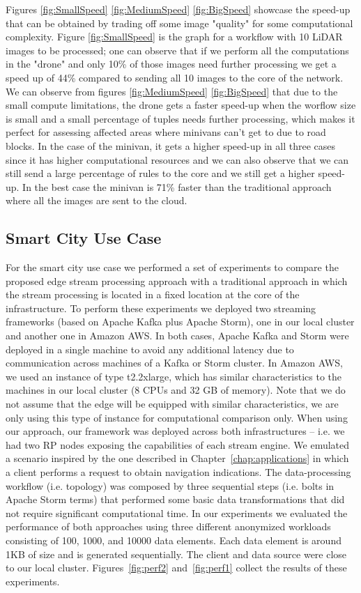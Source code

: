 Figures \ref{fig:SmallSpeed} \ref{fig:MediumSpeed} \ref{fig:BigSpeed} showcase the speed-up that can be obtained by trading off some image "quality" for some computational complexity. Figure \ref{fig:SmallSpeed} is the graph for a workflow with 10 LiDAR images to be processed; one can observe that if we perform all the computations in the "drone" and only 10\% of those images need further processing we get a speed up of 44\% compared to sending all 10 images to the core of the network. We can observe from figures \ref{fig:MediumSpeed} \ref{fig:BigSpeed} that due to the small compute limitations, the drone gets a faster speed-up when the worflow size is small and a small percentage of tuples needs further processing, which makes it perfect for assessing affected areas where minivans can't get to due to road blocks. In the case of the minivan, it gets a higher speed-up in all three cases since it has higher computational resources and we can also observe that we can still send a large percentage of rules to the core and we still get a higher speed-up. In the best case the minivan is 71\% faster than the traditional approach where all the images are sent to the cloud.

\subsection{Smart City Use Case}

For the smart city use case we performed a set of experiments to compare the proposed edge stream processing approach with a traditional approach in which the stream processing is located in a fixed location at the core of the infrastructure. To perform these experiments we deployed two streaming frameworks (based on Apache Kafka plus Apache Storm), one in our local cluster and another one in Amazon AWS. In both cases, Apache Kafka and Storm were deployed in a single machine to avoid any additional latency due to communication across machines of a Kafka or Storm cluster. In Amazon AWS, we used an instance of type  t2.2xlarge, which has similar characteristics to the machines in our local cluster (8 CPUs and 32 GB of memory). Note that we do not assume that the edge will be equipped with similar characteristics, we are only using this type of instance for computational comparison only. When using our approach, our framework was deployed across both infrastructures -- i.e. we had two RP nodes exposing the capabilities of each stream engine. We emulated a scenario inspired by the one described in Chapter~\ref{chap:applications} in which a client performs a request to obtain navigation indications. The data-processing workflow (i.e. topology) was composed by three sequential steps (i.e. bolts in Apache Storm terms) that performed some basic data transformations that did not require significant computational time. In our experiments we evaluated the performance of both approaches using three different anonymized workloads consisting of 100, 1000, and 10000 data elements. Each data element is around 1KB of size and is generated sequentially. The client and data source were close to our local cluster. Figures~\ref{fig:perf2} and~\ref{fig:perf1} collect the results of these experiments.

